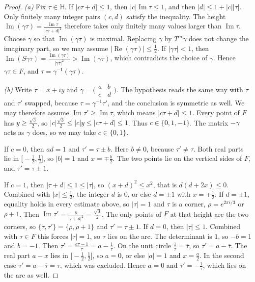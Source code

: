 \begin{proof}
\emph{(a)} Fix $\tau\in\mathbb H$. If $|c\tau+d|\le1$, then $|c|\operatorname{Im}\tau\le1$, and then $|d|\le1+|c||\tau|$. Only finitely many integer pairs $(c,d)$ satisfy the inequality. The height $\operatorname{Im}(\gamma\tau)=\frac{\operatorname{Im}\tau}{|c\tau+d|^2}$ therefore takes only finitely many values larger than $\operatorname{Im}\tau$. Choose $\gamma$ so that $\operatorname{Im}(\gamma\tau)$ is maximal. Replacing $\gamma$ by $T^m\gamma$ does not change the imaginary part, so we may assume $|\operatorname{Re}(\gamma\tau)|\le\frac12$.
If $|\gamma\tau|<1$, then $\operatorname{Im}(S\gamma\tau)=\frac{\operatorname{Im}(\gamma\tau)}{|\gamma\tau|^2}>\operatorname{Im}(\gamma\tau)$, which contradicts the choice of $\gamma$. Hence $\gamma\tau\in F$, and $\tau=\gamma^{-1}(\gamma\tau)$.

\emph{(b)} Write $\tau=x+iy$ and $\gamma=\bigl(\begin{smallmatrix}a&b\\c&d\end{smallmatrix}\bigr)$. The hypothesis reads the same way with $\tau$ and $\tau'$ swapped, because $\tau=\gamma^{-1}\tau'$, and the conclusion is symmetric as well. We may therefore assume $\operatorname{Im}\tau'\ge\operatorname{Im}\tau$, which means $|c\tau+d|\le1$. Every point of $F$ has $y\ge\frac{\sqrt3}2$, so $|c|\frac{\sqrt3}2\le|c|y\le|c\tau+d|\le1$. Thus $c\in\{0,1,-1\}$. The matrix $-\gamma$ acts as $\gamma$ does, so we may take $c\in\{0,1\}$.

If $c=0$, then $ad=1$ and $\tau'=\tau\pm b$. Here $b\ne0$, because $\tau'\ne\tau$. Both real parts lie in $\bigl[-\frac12,\frac12\bigr]$, so $|b|=1$ and $x=\mp\frac b2$. The two points lie on the vertical sides of $F$, and $\tau'=\tau\pm1$.

If $c=1$, then $|\tau+d|\le1\le|\tau|$, so $(x+d)^2\le x^2$, that is $d(d+2x)\le0$. Combined with $|x|\le\frac12$, the integer $d$ is $0$, or else $d=\pm1$ with $x=\mp\frac12$. If $d=\pm1$, equality holds in every estimate above, so $|\tau|=1$ and $\tau$ is a corner, $\rho=e^{2\pi i/3}$ or $\rho+1$. Then $\operatorname{Im}\tau'=\frac{y}{|\tau+d|^2}=\frac{\sqrt3}2$. The only points of $F$ at that height are the two corners, so $\{\tau,\tau'\}=\{\rho,\rho+1\}$ and $\tau'=\tau\pm1$. If $d=0$, then $|\tau|\le1$. Combined with $\tau\in F$ this forces $|\tau|=1$, so $\tau$ lies on the arc. The determinant is $1$, so $-b=1$ and $b=-1$. Then $\tau'=\frac{a\tau-1}{\tau}=a-\frac1\tau$. On the unit circle $\frac1\tau=\overline\tau$, so $\tau'=a-\overline\tau$. The real part $a-x$ lies in $\bigl[-\frac12,\frac12\bigr]$, so $a=0$, or else $|a|=1$ and $x=\frac a2$. In the second case $\tau'=a-\overline\tau=\tau$, which was excluded. Hence $a=0$ and $\tau'=-\frac1\tau$, which lies on the arc as well.
\end{proof}

